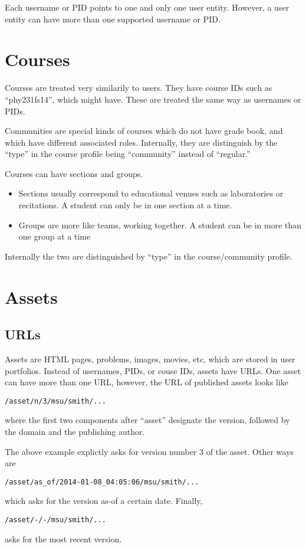 Each username or PID points to one and only one user entity. However, a user entity can have more than one supported username or PID.
\section{Courses}
Courses are treated very similarily to users. They have course IDs such as ``phy231fs14'', which might have. These are treated the same way as usernames or PIDs.

Communities are special kinds of courses which do not have grade book, and which have different associated roles. Internally, they are distinguish by the ``type'' in the course profile being ``community'' instead of ``regular.''

Courses can have sections and groups.
\begin{itemize}
\item Sections usually correspond to educational venues such as laboratories or recitations. A student can only be in one section at a time.
\item Groups are more like teams, working together. A student can be in more than one group at a time
\end{itemize}
Internally the two are distinguished by ``type'' in the course/community profile.
\section{Assets}\label{assets}
\subsection{URLs}
Assets are HTML pages, problems, images, movies, etc, which are stored in user portfolios.
Instead of usernames, PIDs, or couse IDs, assets have URLs. One asset can have more than one URL, however, the URL of published assets looks like
\begin{center}
{\tt /asset/n/3/msu/smith/...}
\end{center}
where the first two components after ``asset'' designate the version, followed by the domain and the publishing author.

The above example explictly asks for version number 3 of the asset. Other ways are
\begin{center}
{\tt /asset/as\_of/2014-01-08\_04:05:06/msu/smith/...}
\end{center}
which asks for the version as-of a certain date. Finally,
\begin{center}
{\tt /asset/-/-/msu/smith/...}
\end{center}
asks for the most recent version.

